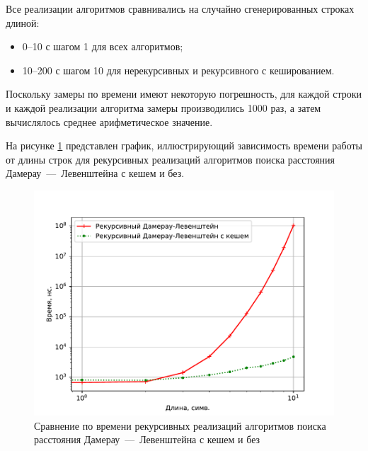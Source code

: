 Все реализации алгоритмов сравнивались на случайно сгенерированных строках длиной:
\begin{itemize}
	\item 0--10 с шагом 1 для всех алгоритмов;
	\item 10--200 с шагом 10 для нерекурсивных и рекурсивного с кешированием. 
\end{itemize}

Поскольку замеры по времени имеют некоторую погрешность, для каждой строки и каждой реализации алгоритма замеры производились 1000 раз, а затем вычислялось среднее арифметическое значение.

На рисунке \ref{plt:time_01} представлен график, иллюстрирующий зависимость времени работы от длины строк для рекурсивных реализаций алгоритмов поиска расстояния Дамерау~---~Левенштейна с кешем и без.
\begin{figure}[H]
	\centering
	\includegraphics[height=0.5\textheight, page=1]{img/figures.pdf}
	\caption{Сравнение по времени рекурсивных реализаций алгоритмов поиска расстояния Дамерау~---~Левенштейна с кешем и без}
	\label{plt:time_01}
\end{figure}


